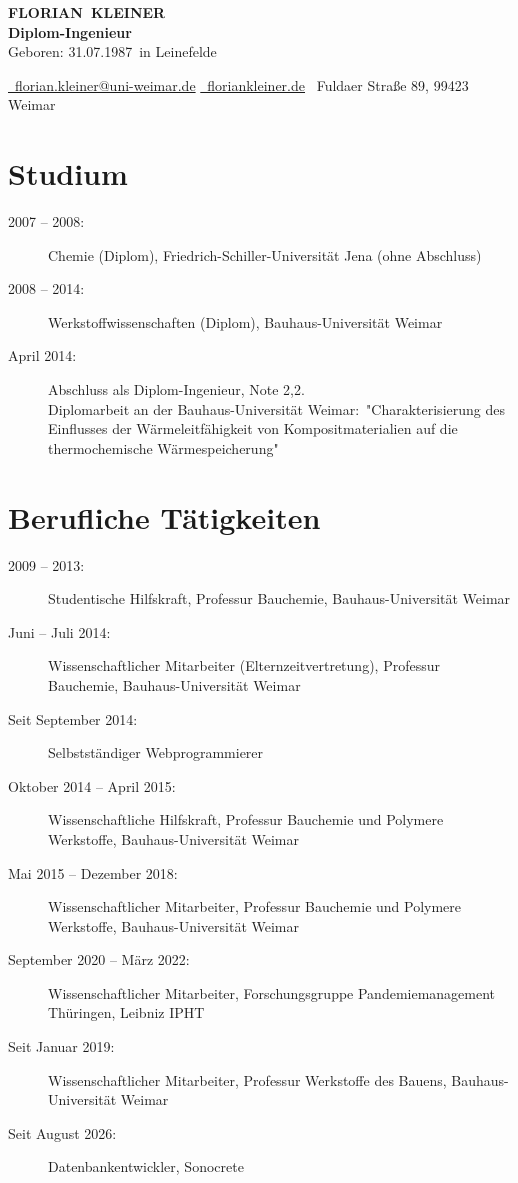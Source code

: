 \documentclass[11pt]{article}
\makeatletter
\newcommand*{\Vorname}{Florian}
\newcommand*{\Nachname}{Kleiner}
\newcommand*{\AbsenderStrasse}{Fuldaer Straße 89}
\newcommand*{\AbsenderPLZOrt}{99423 Weimar}
\newcommand*{\EMail}{florian.kleiner@uni-weimar.de}
\newcommand*{\web}{floriankleiner.de}
\newcommand*{\Geburtstag}{31.07.1987}
\newcommand*{\Geburtsort}{Leinefelde}
\newcommand*{\Ausbildungsgrad}{Diplom-Ingenieur}
\newcommand*{\authorORCID}{0000-0001-6002-0829}
\makeatother
\begin{document}
\begin{center}
	{\Huge\bfseries\uppercase{\Vorname\ \Nachname}} \\ \medskip
	{\Large\textbf{\Ausbildungsgrad}} \\ \medskip
	\small Geboren: \Geburtstag\ in \Geburtsort \\ \medskip

	\href{mailto:\EMail}{\faEnvelope\ \EMail} \quad %
	\href{https://www.\web}{\faGlobe\ \web} \quad \faHome\ \AbsenderStrasse, \AbsenderPLZOrt \\ \medskip
	\orcidlinkf{\authorORCID}

\end{center}

\section{Studium}
\begin{description}
	\item[2007 -- 2008:] Chemie (Diplom), Friedrich-Schiller-Universität Jena (ohne Abschluss)
	\item[2008 -- 2014:] Werkstoffwissenschaften (Diplom), Bauhaus-Universität Weimar
	\item[April 2014:] Abschluss als Diplom-Ingenieur, Note 2,2.\\
		Diplomarbeit an der Bauhaus-Universität Weimar:\
		"Charakterisierung des Einflusses der Wärmeleitfähigkeit von Kompositmaterialien auf die thermochemische Wärmespeicherung"
\end{description}


\section{Berufliche Tätigkeiten}
\begin{description}
	\item[2009 -- 2013:] Studentische Hilfskraft, Professur Bauchemie, Bauhaus-Universität Weimar
	\item[Juni -- Juli 2014:] Wissenschaftlicher Mitarbeiter (Elternzeitvertretung), Professur Bauchemie, Bauhaus-Universität Weimar
	\item[Seit September 2014:] Selbstständiger Webprogrammierer
	\item[Oktober 2014 -- April 2015:] Wissenschaftliche Hilfskraft, Professur Bauchemie und Polymere Werkstoffe, Bauhaus-Universität Weimar
	\item[Mai 2015 -- Dezember 2018:] Wissenschaftlicher Mitarbeiter, Professur Bauchemie und Polymere Werkstoffe, Bauhaus-Universität Weimar
	\item[September 2020 -- März 2022:] Wissenschaftlicher Mitarbeiter, Forschungsgruppe Pandemiemanagement Thüringen, Leibniz IPHT
	\item[Seit Januar 2019:] Wissenschaftlicher Mitarbeiter, Professur Werkstoffe des Bauens, Bau\-haus-Universität Weimar
	\item[Seit August 2026:] Datenbankentwickler, Sonocrete
\end{description}
\end{document}
